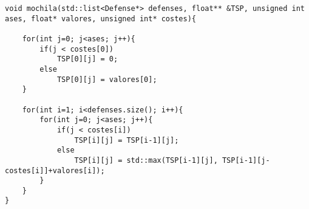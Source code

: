 \begin{lstlisting}
void mochila(std::list<Defense*> defenses, float** &TSP, unsigned int ases, float* valores, unsigned int* costes){

	for(int j=0; j<ases; j++){	
		if(j < costes[0])
			TSP[0][j] = 0;
		else
			TSP[0][j] = valores[0];
	}

	for(int i=1; i<defenses.size(); i++){	
		for(int j=0; j<ases; j++){
			if(j < costes[i])
				TSP[i][j] = TSP[i-1][j];
			else
				TSP[i][j] = std::max(TSP[i-1][j], TSP[i-1][j-costes[i]]+valores[i]);
		}
	}
}
\end{lstlisting}